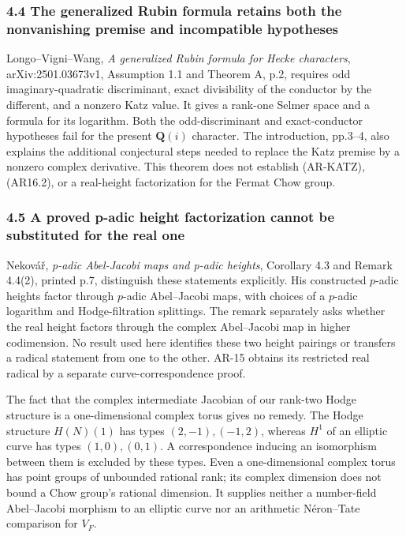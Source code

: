 \subsubsection{4.4 The generalized Rubin formula retains both the
nonvanishing premise and incompatible
hypotheses}\label{the-generalized-rubin-formula-retains-both-the-nonvanishing-premise-and-incompatible-hypotheses}

Longo--Vigni--Wang, \emph{A generalized Rubin formula for Hecke
characters}, arXiv:2501.03673v1, Assumption 1.1 and Theorem A, p.2,
requires odd imaginary-quadratic discriminant, exact divisibility of the
conductor by the different, and a nonzero Katz value. It gives a
rank-one Selmer space and a formula for its logarithm. Both the
odd-discriminant and exact-conductor hypotheses fail for the present
\(\mathbf Q(i)\) character. The introduction, pp.3--4, also explains the
additional conjectural steps needed to replace the Katz premise by a
nonzero complex derivative. This theorem does not establish (AR-KATZ),
(AR16.2), or a real-height factorization for the Fermat Chow group.

\subsubsection{4.5 A proved p-adic height factorization cannot be
substituted for the real
one}\label{a-proved-p-adic-height-factorization-cannot-be-substituted-for-the-real-one}

Nekovář, \emph{p-adic Abel-Jacobi maps and p-adic heights}, Corollary
4.3 and Remark 4.4(2), printed p.7, distinguish these statements
explicitly. His constructed \(p\)-adic heights factor through \(p\)-adic
Abel--Jacobi maps, with choices of a \(p\)-adic logarithm and
Hodge-filtration splittings. The remark separately asks whether the real
height factors through the complex Abel--Jacobi map in higher
codimension. No result used here identifies these two height pairings or
transfers a radical statement from one to the other. AR-15 obtains its
restricted real radical by a separate curve-correspondence proof.

The fact that the complex intermediate Jacobian of our rank-two Hodge
structure is a one-dimensional complex torus gives no remedy. The Hodge
structure \(H(N)(1)\) has types \((2,-1),(-1,2)\), whereas \(H^1\) of an
elliptic curve has types \((1,0),(0,1)\). A correspondence inducing an
isomorphism between them is excluded by these types. Even a
one-dimensional complex torus has point groups of unbounded rational
rank; its complex dimension does not bound a Chow group's rational
dimension. It supplies neither a number-field Abel--Jacobi morphism to
an elliptic curve nor an arithmetic Néron--Tate comparison for \(V_F\).

